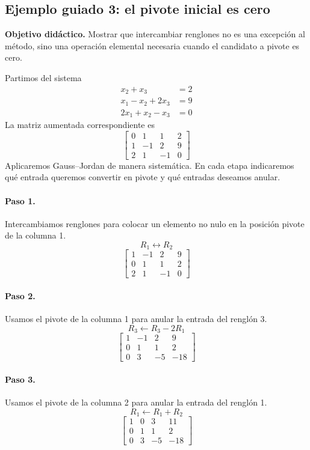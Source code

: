 \documentclass[12pt]{article}
\theoremstyle{remark}
\begin{document}
\subsection*{Ejemplo guiado 3: el pivote inicial es cero}
\textbf{Objetivo didáctico.} Mostrar que intercambiar renglones no es una excepción al método, sino una operación elemental necesaria cuando el candidato a pivote es cero.

Partimos del sistema
\[
\begin{aligned}
x_{2} + x_{3} &= 2\\
x_{1} - x_{2} + 2 x_{3} &= 9\\
2 x_{1} + x_{2} - x_{3} &= 0
\end{aligned}
\]
La matriz aumentada correspondiente es
\[
\left[\begin{array}{ccc|c}
0 & 1 & 1 & 2\\
1 & -1 & 2 & 9\\
2 & 1 & -1 & 0
\end{array}\right]
\]
Aplicaremos Gauss--Jordan de manera sistemática. En cada etapa indicaremos qué entrada queremos convertir en pivote y qué entradas deseamos anular.
\paragraph{Paso 1.} Intercambiamos renglones para colocar un elemento no nulo en la posición pivote de la columna 1.
\[
R_{1}\leftrightarrow R_{2}
\]
\[
\left[\begin{array}{ccc|c}
1 & -1 & 2 & 9\\
0 & 1 & 1 & 2\\
2 & 1 & -1 & 0
\end{array}\right]
\]
\paragraph{Paso 2.} Usamos el pivote de la columna 1 para anular la entrada del renglón 3.
\[
R_{3}\leftarrow R_{3}-2R_{1}
\]
\[
\left[\begin{array}{ccc|c}
1 & -1 & 2 & 9\\
0 & 1 & 1 & 2\\
0 & 3 & -5 & -18
\end{array}\right]
\]
\paragraph{Paso 3.} Usamos el pivote de la columna 2 para anular la entrada del renglón 1.
\[
R_{1}\leftarrow R_{1}+R_{2}
\]
\[
\left[\begin{array}{ccc|c}
1 & 0 & 3 & 11\\
0 & 1 & 1 & 2\\
0 & 3 & -5 & -18
\end{array}\right]
\]
\end{document}
